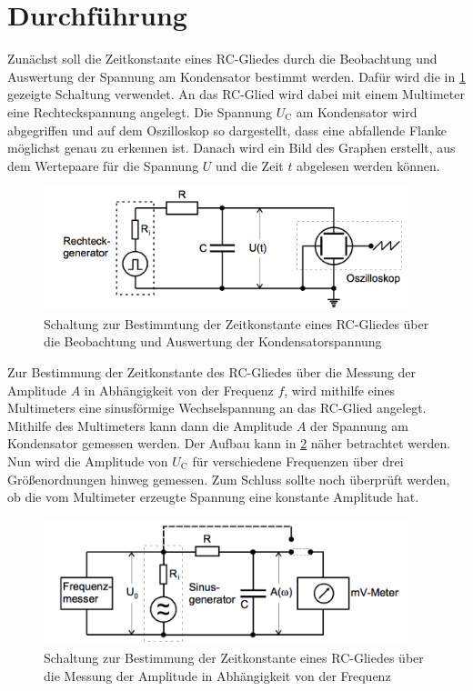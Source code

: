 \section{Durchführung}
\label{sec:Durchführung}
Zunächst soll die Zeitkonstante eines RC-Gliedes durch die Beobachtung und Auswertung
der Spannung am Kondensator bestimmt werden. Dafür wird die in \ref{fig:Schaltung_4a}
gezeigte Schaltung verwendet. An das RC-Glied wird dabei mit einem Multimeter eine
Rechteckspannung angelegt. Die Spannung $U_{\text{C}}$ am Kondensator wird abgegriffen und auf dem
Oszilloskop so dargestellt, dass eine abfallende Flanke möglichst genau zu erkennen ist.
Danach wird ein Bild des Graphen erstellt, aus dem Wertepaare für die Spannung $U$
und die Zeit $t$ abgelesen werden können.

\begin{figure}
  \centering
  \includegraphics[width=300pt]{4a_schaltung.png}
  \caption{Schaltung zur Bestimmtung der Zeitkonstante eines RC-Gliedes über die Beobachtung
  und Auswertung der Kondensatorspannung \cite{Versuchsanleitung}}
  \label{fig:Schaltung_4a}
\end{figure}

Zur Bestimmung der Zeitkonstante des RC-Gliedes über die Messung der Amplitude $A$ in
Abhängigkeit von der Frequenz $f$, wird mithilfe eines Multimeters eine sinusförmige
Wechselspannung an das RC-Glied angelegt. Mithilfe des Multimeters kann dann die Amplitude
$A$ der Spannung am Kondensator gemessen werden. Der Aufbau kann in \ref{fig:Schaltung_4b}
näher betrachtet werden. Nun wird die Amplitude von $U_{\text{C}}$ für
verschiedene Frequenzen über drei Größenordnungen hinweg gemessen. Zum Schluss sollte
noch überprüft werden, ob die vom Multimeter erzeugte Spannung eine konstante Amplitude hat.

\begin{figure}
  \centering
  \includegraphics[width=300pt]{4b_schaltung.png}
  \caption{Schaltung zur Bestimmung der Zeitkonstante eines RC-Gliedes über die Messung
  der Amplitude in Abhängigkeit von der Frequenz \cite{Versuchsanleitung}}
  \label{fig:Schaltung_4b}
\end{figure}

